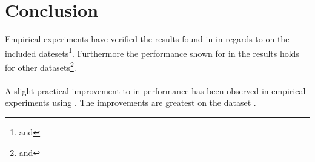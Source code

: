 \section{Conclusion}
\label{conclusion}
Empirical experiments have verified the results found in \cite{wagner17} in regards to \qs{} on the included datesets\footnote{\mnist{} and \sift{}}. Furthermore the performance shown for \qs{} in the results holds for other datasets\footnote{\gist{} and \clust{}}.
\\
\\
A slight practical improvement to \qs{} in performance has been observed in empirical experiments using \qsr{}. The improvements are greatest on the dataset \mnist{}.
